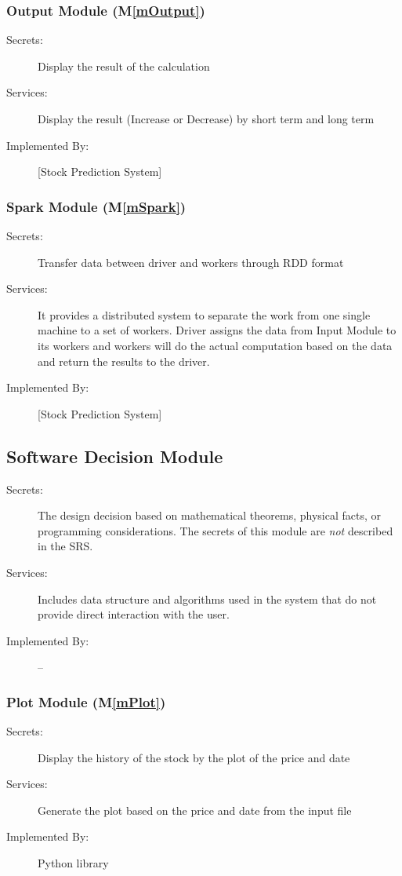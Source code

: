 \documentclass[12pt, titlepage]{article}
\newcommand{\mref}[1]{M\ref{#1}}
\begin{document}
\subsubsection{Output Module (\mref{mOutput})}
\begin{description}
\item[Secrets:] Display the result of the calculation
\item[Services:] Display the result (Increase or Decrease) by short term and long term
\item[Implemented By:] [Stock Prediction System]
\end{description}

\subsubsection{Spark Module (\mref{mSpark})}
\begin{description}
\item[Secrets:] Transfer data between driver and workers through RDD format
\item[Services:] It provides a distributed system to separate the work from one single machine to a set of workers. Driver assigns the data from Input Module to its workers and workers will do the actual computation based on the data and return the results to the driver.
\item[Implemented By:] [Stock Prediction System]
\end{description}

\subsection{Software Decision Module}

\begin{description}
\item[Secrets:] The design decision based on mathematical theorems, physical
facts, or programming considerations. The secrets of this module are
\emph{not} described in the SRS.
\item[Services:] Includes data structure and algorithms used in the system that
do not provide direct interaction with the user. 
\item[Implemented By:] --
\end{description}

\subsubsection{Plot Module (\mref{mPlot})}
\begin{description}
\item[Secrets:] Display the history of the stock by the plot of the price and date
\item[Services:] Generate the plot based on the price and date from the input file
\item[Implemented By:] Python library
\end{description}
\end{document}

